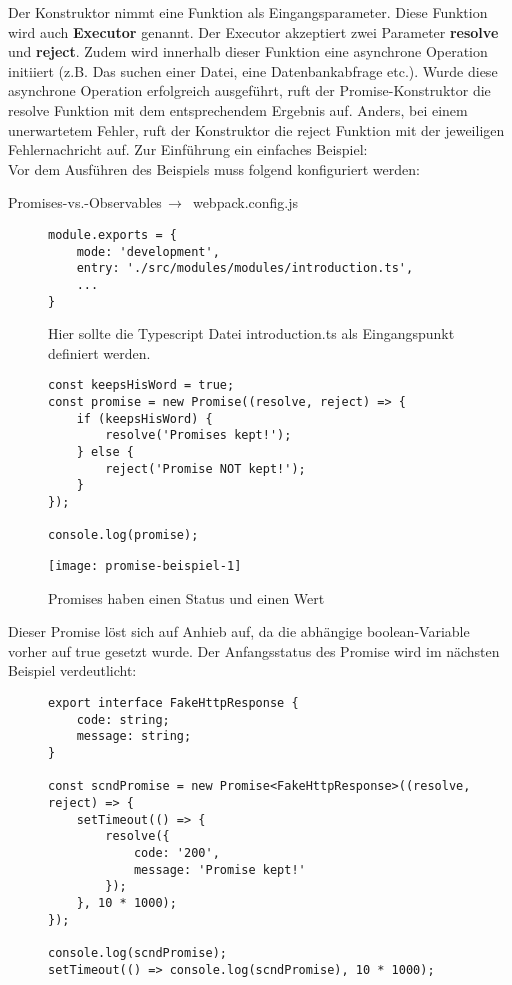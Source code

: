 Der Konstruktor nimmt eine Funktion als Eingangsparameter. Diese Funktion wird auch \textbf{Executor} genannt.\cite{promise-executor} Der Executor akzeptiert zwei Parameter \textbf{resolve} und \textbf{reject}.
Zudem wird innerhalb dieser Funktion eine asynchrone Operation initiiert (z.B. Das suchen einer Datei, eine Datenbankabfrage etc.). Wurde diese asynchrone Operation erfolgreich ausgeführt, ruft der Promise-Konstruktor die resolve Funktion mit dem entsprechendem Ergebnis auf. Anders, bei einem unerwartetem Fehler, ruft der Konstruktor die reject Funktion mit der jeweiligen Fehlernachricht auf. Zur Einführung ein einfaches Beispiel:\\

\noindent
Vor dem Ausführen des Beispiels muss folgend konfiguriert werden:
 \begin{center}
     Promises-vs.-Observables$\,\to\,$ webpack.config.js
 \end{center}

\begin{figure}[H]
\begin{lstlisting}
module.exports = {
    mode: 'development',
    entry: './src/modules/modules/introduction.ts',
    ...
}
\end{lstlisting}
\caption{Hier sollte die Typescript Datei introduction.ts als Eingangspunkt definiert werden.}
\end{figure}


\begin{figure}[H]
\begin{lstlisting}
const keepsHisWord = true;
const promise = new Promise((resolve, reject) => {
    if (keepsHisWord) {
        resolve('Promises kept!');
    } else {
        reject('Promise NOT kept!');
    }
});

console.log(promise);
\end{lstlisting}
\end{figure}


\begin{figure}[H]
\centering
\texttt{[image: promise-beispiel-1]}
\caption{Promises haben einen Status und einen Wert}
\end{figure}

\noindent
Dieser Promise löst sich auf Anhieb auf, da die abhängige boolean-Variable vorher auf true gesetzt wurde. Der Anfangsstatus des Promise wird im nächsten Beispiel verdeutlicht:

\begin{figure}[H]
\begin{lstlisting}
export interface FakeHttpResponse {
    code: string;
    message: string;
}

const scndPromise = new Promise<FakeHttpResponse>((resolve, reject) => {
    setTimeout(() => {
        resolve({
            code: '200',
            message: 'Promise kept!'
        });
    }, 10 * 1000);
});

console.log(scndPromise);
setTimeout(() => console.log(scndPromise), 10 * 1000);
\end{lstlisting}
\end{figure}

